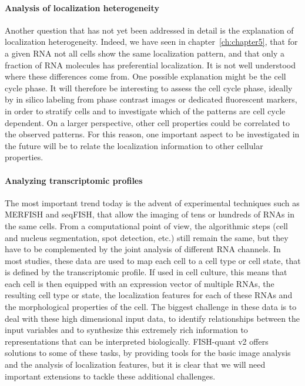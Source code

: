 \paragraph{Analysis of localization heterogeneity}
Another question that has not yet been addressed in detail is the explanation of localization heterogeneity.
Indeed, we have seen in chapter~\ref{ch:chapter5}, that for a given \ac{RNA} not all cells show the same localization pattern, and that only a fraction of \ac{RNA} molecules has preferential localization.
It is not well understood where these differences come from.
One possible explanation might be the cell cycle phase.
It will therefore be interesting to assess the cell cycle phase, ideally by in silico labeling from phase contrast images or dedicated fluorescent markers, in order to stratify cells and to investigate which of the patterns are cell cycle dependent.
On a larger perspective, other cell properties could be correlated to the observed patterns.
For this reason, one important aspect to be investigated in the future will be to relate the localization information to other cellular properties.

\paragraph{Analyzing transcriptomic profiles}
The most important trend today is the advent of experimental techniques such as MERFISH and seqFISH, that allow the imaging of tens or hundreds of \ac{RNA}s in the same cells.
From a computational point of view, the algorithmic steps (cell and nucleus segmentation, spot detection, etc.) still remain the same, but they have to be complemented by the joint analysis of different \ac{RNA} channels.
In most studies, these data are used to map each cell to a cell type or cell state, that is defined by the transcriptomic profile.
If used in cell culture, this means that each cell is then equipped with an expression vector of multiple \ac{RNA}s, the resulting cell type or state, the localization features for each of these \ac{RNA}s and the morphological properties of the cell.
The biggest challenge in these data is to deal with these high dimensional input data, to identify relationships between the input variables and to synthesize this extremely rich information to representations that can be interpreted biologically.
FISH-quant v2 offers solutions to some of these tasks, by providing tools for the basic image analysis and the analysis of localization features, but it is clear that we will need important extensions to tackle these additional challenges.

